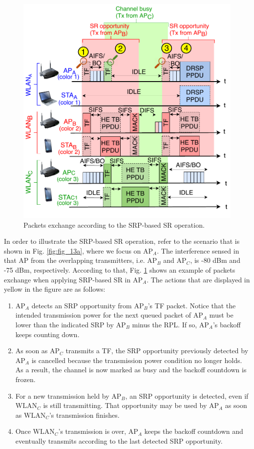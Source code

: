 \documentclass[comsoc]{IEEEtran}
\begin{document}
	\begin{figure}[ht!]
		\centering
		\includegraphics[width=\columnwidth]{fig_13b}
		\caption{Packets exchange according to the SRP-based SR operation.}
		\label{fig:fig_13b}
	\end{figure}
	
	In order to illustrate the SRP-based SR operation, refer to the scenario that is shown in Fig. \ref{fig:fig_13a}, where we focus on $\text{AP}_A$. The interference sensed in that AP from the overlapping transmitters, i.e. $\text{AP}_B$ and $\text{AP}_C$, is -80 dBm and -75 dBm, respectively. According to that, Fig. \ref{fig:fig_13b} shows an example of packets exchange when applying SRP-based SR in $\text{AP}_A$. The actions that are displayed in yellow in the figure are as follows:
	\begin{enumerate}
		\item $\text{AP}_A$ detects an SRP opportunity from $\text{AP}_B$'s TF packet. Notice that the intended transmission power for the next queued packet of $\text{AP}_A$ must be lower than the indicated SRP by $\text{AP}_B$ minus the RPL. If so, $\text{AP}_A$'s backoff keeps counting down.
		\item As soon as $\text{AP}_C$ transmits a TF, the SRP opportunity previously detected by $\text{AP}_A$ is cancelled because the transmission power condition no longer holds. As a result, the channel is now marked as busy and the backoff countdown is frozen.
		\item For a new transmission held by $\text{AP}_B$, an SRP opportunity is detected, even if $\text{WLAN}_C$ is still transmitting. That opportunity may be used by $\text{AP}_A$ as soon as $\text{WLAN}_C$'s transmission finishes.
		\item Once $\text{WLAN}_C$'s transmission is over, $\text{AP}_A$ keeps the backoff countdown and eventually transmits according to the last detected SRP opportunity.
	\end{enumerate}
	
\end{document}
